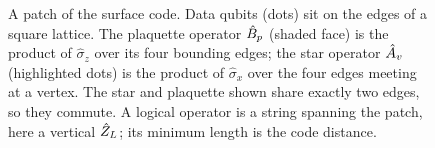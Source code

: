 \begin{figure}[t]
  \centering
  \caption{A patch of the surface code. Data qubits (dots) sit on the
  edges of a square lattice. The plaquette operator $\hat{B}_p$ (shaded
  face) is the product of $\hat\sigma_z$ over its four bounding edges;
  the star operator $\hat{A}_v$ (highlighted dots) is the product of
  $\hat\sigma_x$ over the four edges meeting at a vertex. The star and
  plaquette shown share exactly two edges, so they commute. A logical
  operator is a string spanning the patch, here a vertical $\hat{Z}_L$;
  its minimum length is the code distance.}
  \label{fig:surface-code}
\end{figure}

